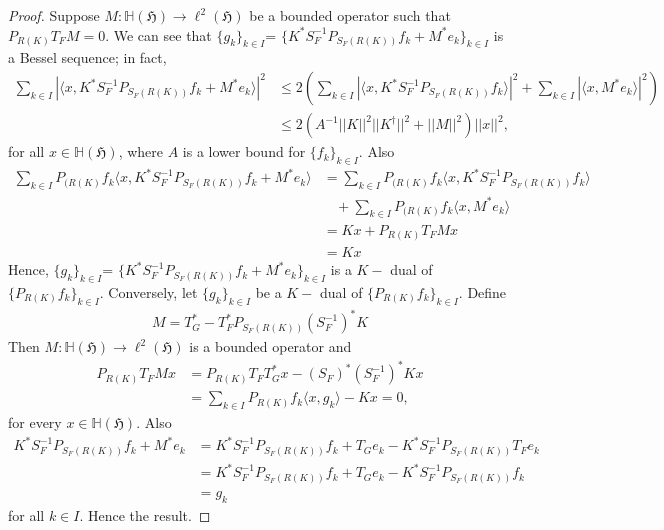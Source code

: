 \documentclass[10pt,a4paper]{amsart}
\begin{document}
	\begin{proof}
		
		Suppose $M:\mathbb{H}(\mathfrak{H}) \to \ell ^2(\mathfrak{H})$ be a bounded operator such that $P_{R(K)}T_FM=0$.
		We can see that $\{   g_k\}_{k\in I}$= $\{K^* S_F^{-1}P_{S_F(R(K))}f_k + M^*e_k\}_{k\in I}$ is a Bessel sequence; in fact, 
		\begin{align*}
			\sum_{k\in I}|\langle x, K^* S_F^{-1}P_{S_F(R(K))}f_k + M^*e_k\rangle |^2&\le 2\left(\sum_{k\in I} |\langle x, K^* S_F^{-1}P_{S_F(R(K))}f_k\rangle|^2 +\sum_{k\in I}|\langle x,M^*e_k\rangle |^2\right)\\
			&\le 2(A^{-1}||K||^2||K^{\dagger}||^2+||M||^2)||x||^2,
		\end{align*}
		for all $x\in \mathbb{H}(\mathfrak{H})$, where $A$ is a lower bound for $\{f_k\}_{k\in I}$. Also
		\begin{align*}
			\sum_{k\in I} P_{(R(K)}f_k\langle x, K^* S_F^{-1}P_{S_F(R(K))}f_k +M^*e_k\rangle  &=\sum_{k\in I}P_{(R(K)}f_k\langle x, K^* S_F^{-1}P_{S_F(R(K))}f_k\rangle \\ &\ \ \ \ +\sum_{k\in I}P_{(R(K)}f_k\langle x, M^*e_k\rangle \\
			&=Kx+ P_{R(K)}T_FMx\\
			&=Kx
		\end{align*}
		Hence, $\{   g_k\}_{k\in I}$= $\{K^* S_F^{-1}P_{S_F(R(K))}f_k + M^*e_k\}_{k\in I}$ is a $K-$ dual of $\{P_{R(K)}f_k\}_{k\in  I}$. Conversely, let $\{g_k\}_{k\in I}$ be a $K-$ dual of $\{P_{R(K)}f_k\}_{k\in I}$. Define
		\begin{align*}
			M=T_G^*-T_F^*P_{S_F(R(K))}(S_F^{-1})^*K
		\end{align*}
		Then $M: \mathbb{H}(\mathfrak{H}) \to \ell ^2(\mathfrak{H})$ is a bounded operator and
		\begin{align*}
			P_{R(K)}T_FMx&=P_{R(K)}T_FT_G^*x-(S_F)^*(S_F^{-1})^*Kx\\
			&=\sum_{k\in I}P_{R(K)}f_k \langle x, g_k \rangle -Kx=0,
		\end{align*}
		for every $x\in \mathbb{H}(\mathfrak{H})$. Also
		\begin{align*}
			K^* S_F^{-1}P_{S_F(R(K))}f_k + M^*e_k&=   K^* S_F^{-1}P_{S_F(R(K))}f_k+T_Ge_k-K^*S_F^{-1}P_{S_F(R(K))}T_Fe_k\\
			&= K^* S_F^{-1}P_{S_F(R(K))}f_k+T_Ge_k-K^*S_F^{-1}P_{S_F(R(K))}f_k\\
			&=g_k
		\end{align*}
		for all $k\in I$. Hence the result.
	\end{proof}
\end{document}
